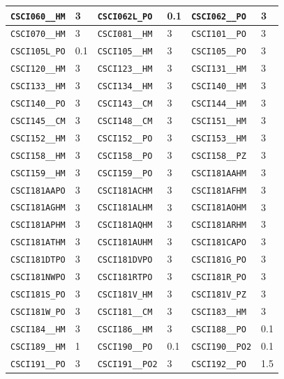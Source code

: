 \begin{longtable}{|l|l||l|l||l|l|}
    \verb|CSCI060__HM| & 3 & \verb|CSCI062L_PO| & 0.1 & \verb|CSCI062__PO| & 3\\\hline
    \verb|CSCI070__HM| & 3 & \verb|CSCI081__HM| & 3 & \verb|CSCI101__PO| & 3\\\hline
    \verb|CSCI105L_PO| & 0.1 & \verb|CSCI105__HM| & 3 & \verb|CSCI105__PO| & 3\\\hline
    \verb|CSCI120__HM| & 3 & \verb|CSCI123__HM| & 3 & \verb|CSCI131__HM| & 3\\\hline
    \verb|CSCI133__HM| & 3 & \verb|CSCI134__HM| & 3 & \verb|CSCI140__HM| & 3\\\hline
    \verb|CSCI140__PO| & 3 & \verb|CSCI143__CM| & 3 & \verb|CSCI144__HM| & 3\\\hline
    \verb|CSCI145__CM| & 3 & \verb|CSCI148__CM| & 3 & \verb|CSCI151__HM| & 3\\\hline
    \verb|CSCI152__HM| & 3 & \verb|CSCI152__PO| & 3 & \verb|CSCI153__HM| & 3\\\hline
    \verb|CSCI158__HM| & 3 & \verb|CSCI158__PO| & 3 & \verb|CSCI158__PZ| & 3\\\hline
    \verb|CSCI159__HM| & 3 & \verb|CSCI159__PO| & 3 & \verb|CSCI181AAHM| & 3\\\hline
    \verb|CSCI181AAPO| & 3 & \verb|CSCI181ACHM| & 3 & \verb|CSCI181AFHM| & 3\\\hline
    \verb|CSCI181AGHM| & 3 & \verb|CSCI181ALHM| & 3 & \verb|CSCI181AOHM| & 3\\\hline
    \verb|CSCI181APHM| & 3 & \verb|CSCI181AQHM| & 3 & \verb|CSCI181ARHM| & 3\\\hline
    \verb|CSCI181ATHM| & 3 & \verb|CSCI181AUHM| & 3 & \verb|CSCI181CAPO| & 3\\\hline
    \verb|CSCI181DTPO| & 3 & \verb|CSCI181DVPO| & 3 & \verb|CSCI181G_PO| & 3\\\hline
    \verb|CSCI181NWPO| & 3 & \verb|CSCI181RTPO| & 3 & \verb|CSCI181R_PO| & 3\\\hline
    \verb|CSCI181S_PO| & 3 & \verb|CSCI181V_HM| & 3 & \verb|CSCI181V_PZ| & 3\\\hline
    \verb|CSCI181W_PO| & 3 & \verb|CSCI181__CM| & 3 & \verb|CSCI183__HM| & 3\\\hline
    \verb|CSCI184__HM| & 3 & \verb|CSCI186__HM| & 3 & \verb|CSCI188__PO| & 0.1\\\hline
    \verb|CSCI189__HM| & 1 & \verb|CSCI190__PO| & 0.1 & \verb|CSCI190__PO2| & 0.1\\\hline
    \verb|CSCI191__PO| & 3 & \verb|CSCI191__PO2| & 3 & \verb|CSCI192__PO| & 1.5\\\hline

\end{longtable}
